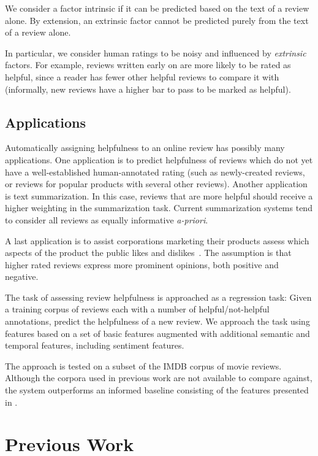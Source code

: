 \documentclass[12pt,letterpaper]{article}
\begin{document}
We consider a factor intrinsic if it can be predicted based on the text of a review alone. By extension, an extrinsic factor cannot be predicted purely from the text of a review alone.

In particular, we consider human ratings to be noisy and influenced by {\em extrinsic} factors. For example, reviews written early on are more likely to be rated as helpful, since a reader has fewer other helpful reviews to compare it with (informally, new reviews have a higher bar to pass to be marked as helpful).


\subsection{Applications}
Automatically assigning helpfulness to an online review has possibly many applications. One application is to predict helpfulness of reviews which do not yet have a well-established human-annotated rating (such as newly-created reviews, or reviews for popular products with several other reviews).  Another application is text summarization. In this case, reviews that are more helpful should receive a higher weighting in the summarization task. Current summarization systems tend to consider all reviews as  equally informative {\em a-priori}.

A last application is to assist corporations marketing their products assess which aspects of the 
	product the public likes and dislikes~\cite{2007ghose-helpfulness}. The assumption is that higher rated reviews express more prominent opinions, both positive and negative.



The task of assessing review helpfulness is approached as a regression task:
Given a training corpus of reviews each with a number of helpful/not-helpful
	annotations, predict the helpfulness of a new review.
We approach the task using features based on a set of basic features augmented
	with additional semantic and temporal features, including sentiment
	features.

The approach is tested on a subset of the IMDB corpus of movie reviews.
Although the corpora used in previous work are not available
	to compare against, the system outperforms an informed baseline consisting
	of the features presented in .


\section{Previous Work}
\end{document}
